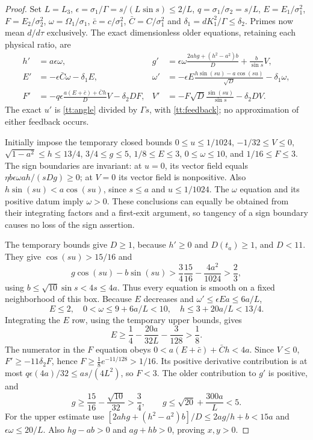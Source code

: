 \begin{proof}
Set $L=L_3$, $\epsilon=\sigma_1/\Gamma=s/(L\sin s)\leq2/L$,
$q=\sigma_1/\sigma_2=s/L$, $E=E_1/\sigma_1^2$,
$F=E_2/\sigma_2^2$, $\omega=\Omega_1/\sigma_1$,
$\bar c=c/\sigma_1^2$, $\bar C=C/\sigma_1^2$ and
$\delta_1=dK_1^2/\Gamma\leq\delta_2$.
Primes now mean $d/d\tau$ exclusively. The exact dimensionless
older equations, retaining each physical ratio, are
\begin{align}\label{tt:scaled}
 h'&=a\epsilon\omega,&
 g'&=\epsilon\omega\frac{2ahg+(h^2-a^2)b}{D}
                    +\frac b{\sin s}V,\\
 E'&=-\epsilon\bar C\omega-\delta_1E,&
 \omega'&=-\epsilon E\frac{h\sin(su)-a\cos(su)}{\sqrt D}
                      -\delta_1\omega,\nonumber\\
 F'&=-q\epsilon\frac{a(E+\bar c)+\bar Ch}{D}V
                      -\delta_2DF,&
 V'&=-F\sqrt D\frac{\sin(su)}{\sin s}-\delta_2DV.\nonumber
\end{align}
The exact $u'$ is \eqref{tt:angle} divided by $\Gamma s$,
with \eqref{tt:feedback}; no approximation of either feedback occurs.

Initially impose the temporary closed bounds
$0\leq u\leq1/1024$, $-1/32\leq V\leq0$,
$\sqrt{1-a^2}\leq h\leq13/4$, $3/4\leq g\leq5$,
$1/8\leq E\leq3$, $0\leq\omega\leq10$, and $1/16\leq F\leq3$.
The sign boundaries are invariant: at $u=0$, its vector field equals
$\eta b\epsilon\omega ah/(sDg)\geq0$; at $V=0$ its vector field
is nonpositive. Also
$h\sin(su)<a\cos(su)$, since $s\leq a$ and $u\leq1/1024$.
The $\omega$ equation and its positive datum imply $\omega>0$.
These conclusions can equally be obtained from their integrating
factors and a first-exit argument, so tangency of a sign boundary
causes no loss of the sign assertion.

The temporary bounds give $D\geq1$, because $h'\geq0$ and
$D(t_a)\geq1$, and $D<11$. They give
$\cos(su)>15/16$ and
\[
 g\cos(su)-b\sin(su)
 >\frac34\frac{15}{16}-\frac{4a^2}{1024}>\frac23,
\]
using $b\leq\sqrt{10}\sin s<4s\leq4a$.
Thus every equation is smooth on a fixed neighborhood of this box.
Because $E$ decreases and $\omega'\leq\epsilon E a\leq6a/L$,
\[
 E\leq2,\quad 0<\omega\leq9+6a/L<10,\quad
 h\leq3+20a/L<13/4.
\]
Integrating the $E$ row, using the temporary upper bounds, gives
\[
 E\geq\frac14-\frac{20a}{32L}-\frac3{128}>\frac18.
\]
The numerator in the $F$ equation obeys
$0<a(E+\bar c)+\bar Ch<4a$. Since $V\leq0$,
$F'\geq-11\delta_2F$, hence
$F\geq\tfrac18e^{-11/128}>1/16$.
Its positive derivative contribution is at most
$q\epsilon(4a)/32\leq as/(4L^2)$, so $F<3$.
The older contribution to $g'$ is positive, and
\[
 g\geq\frac{15}{16}-\frac{\sqrt{10}}{32}>\frac34,
 \qquad
 g\leq\sqrt{20}+\frac{300a}{L}<5.
\]
For the upper estimate use
$[2ahg+(h^2-a^2)b]/D\leq2ag/h+b<15a$
and $\epsilon\omega\leq20/L$.
Also $hg-ab>0$ and $ag+hb>0$, proving $x,y>0$.


\end{proof}
